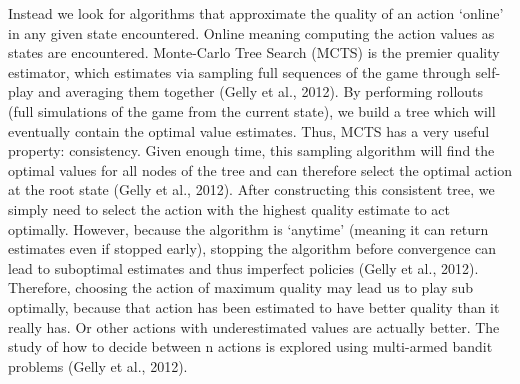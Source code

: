 \documentclass[msc, deptreport, ai, romanprepages]{infthesis}
\begin{document}
Instead we look for algorithms that approximate the quality of an action ‘online’ in any given state encountered. Online meaning computing the action values as states are encountered. Monte-Carlo Tree Search (MCTS) is the premier quality estimator, which estimates via sampling full sequences of the game through self-play and averaging them together (Gelly et al., 2012). By performing rollouts (full simulations of the game from the current state), we build a tree which will eventually contain the optimal value estimates. Thus, MCTS has a very useful property: consistency. Given enough time, this sampling algorithm will find the optimal values for all nodes of the tree and can therefore select the optimal action at the root state (Gelly et al., 2012). After constructing this consistent tree, we simply need to select the action with the highest quality estimate to act optimally. However, because the algorithm is ‘anytime’ (meaning it can return estimates even if stopped early), stopping the algorithm before convergence can lead to suboptimal estimates and thus imperfect policies (Gelly et al., 2012). Therefore, choosing the action of maximum quality may lead us to play sub optimally, because that action has been estimated to have better quality than it really has. Or other actions with underestimated values are actually better. The study of how to decide between n actions is explored using multi-armed bandit problems (Gelly et al., 2012). 
\end{document}
